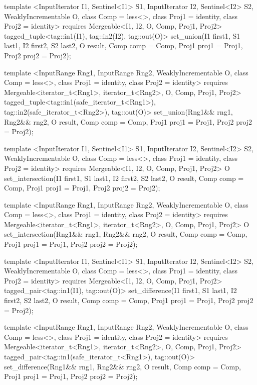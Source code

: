 {\begin{codeblock}
{{    template <InputIterator I1, Sentinel<I1> S1, InputIterator I2, Sentinel<I2> S2,
        WeaklyIncrementable O, class Comp = less<>, class Proj1 = identity, class Proj2 = identity>
      requires Mergeable<I1, I2, O, Comp, Proj1, Proj2>
      tagged_tuple<tag::in1(I1), tag::in2(I2), tag::out(O)>
        set_union(I1 first1, S1 last1, I2 first2, S2 last2, O result, Comp comp = Comp{},
                  Proj1 proj1 = Proj1{}, Proj2 proj2 = Proj2{});

    template <InputRange Rng1, InputRange Rng2, WeaklyIncrementable O,
        class Comp = less<>, class Proj1 = identity, class Proj2 = identity>
      requires Mergeable<iterator_t<Rng1>, iterator_t<Rng2>, O, Comp, Proj1, Proj2>
      tagged_tuple<tag::in1(safe_iterator_t<Rng1>),
                   tag::in2(safe_iterator_t<Rng2>),
                   tag::out(O)>
        set_union(Rng1&& rng1, Rng2&& rng2, O result, Comp comp = Comp{},
                  Proj1 proj1 = Proj1{}, Proj2 proj2 = Proj2{});

    template <InputIterator I1, Sentinel<I1> S1, InputIterator I2, Sentinel<I2> S2,
        WeaklyIncrementable O, class Comp = less<>, class Proj1 = identity, class Proj2 = identity>
      requires Mergeable<I1, I2, O, Comp, Proj1, Proj2>
      O set_intersection(I1 first1, S1 last1, I2 first2, S2 last2, O result,
                         Comp comp = Comp{}, Proj1 proj1 = Proj1{}, Proj2 proj2 = Proj2{});

    template <InputRange Rng1, InputRange Rng2, WeaklyIncrementable O,
        class Comp = less<>, class Proj1 = identity, class Proj2 = identity>
      requires Mergeable<iterator_t<Rng1>, iterator_t<Rng2>, O, Comp, Proj1, Proj2>
      O set_intersection(Rng1&& rng1, Rng2&& rng2, O result,
                         Comp comp = Comp{}, Proj1 proj1 = Proj1{}, Proj2 proj2 = Proj2{});

    template <InputIterator I1, Sentinel<I1> S1, InputIterator I2, Sentinel<I2> S2,
        WeaklyIncrementable O, class Comp = less<>, class Proj1 = identity, class Proj2 = identity>
      requires Mergeable<I1, I2, O, Comp, Proj1, Proj2>
      tagged_pair<tag::in1(I1), tag::out(O)>
        set_difference(I1 first1, S1 last1, I2 first2, S2 last2, O result,
                       Comp comp = Comp{}, Proj1 proj1 = Proj1{}, Proj2 proj2 = Proj2{});

    template <InputRange Rng1, InputRange Rng2, WeaklyIncrementable O,
        class Comp = less<>, class Proj1 = identity, class Proj2 = identity>
      requires Mergeable<iterator_t<Rng1>, iterator_t<Rng2>, O, Comp, Proj1, Proj2>
      tagged_pair<tag::in1(safe_iterator_t<Rng1>), tag::out(O)>
        set_difference(Rng1&& rng1, Rng2&& rng2, O result,
                       Comp comp = Comp{}, Proj1 proj1 = Proj1{}, Proj2 proj2 = Proj2{});

}}
\end{codeblock}}
